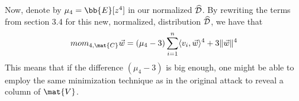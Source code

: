 Now, denote by $\mu_4 = \bb{E}[z^4]$ in our normalized $\widehat{\mathcal{D}}$. By rewriting the terms from section 3.4 for this new, normalized, distribution $\widehat{\mathcal{D}}$, we have that
\[mom_{4, \mat{C}} \vec{w} = (\mu_4 - 3) \sum_{i=1}^{n} \langle v_i, \vec{w} \rangle^4 + 3 \lVert \vec{w} \rVert ^4 \]
This means that if the difference $(\mu_4 - 3)$ is big enough, one might be able to employ the same minimization technique as in the original attack to reveal a column of $\mat{V}$.
